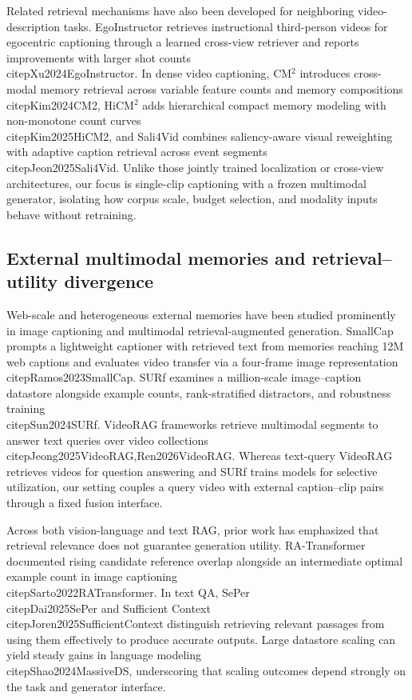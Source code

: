 \documentclass[11pt,a4paper]{article}
\begin{document}
Related retrieval mechanisms have also been developed for neighboring video-description tasks. EgoInstructor retrieves instructional third-person videos for egocentric captioning through a learned cross-view retriever and reports improvements with larger shot counts \\citep{Xu2024EgoInstructor}. In dense video captioning, CM$^2$ introduces cross-modal memory retrieval across variable feature counts and memory compositions \\citep{Kim2024CM2}, HiCM$^2$ adds hierarchical compact memory modeling with non-monotone count curves \\citep{Kim2025HiCM2}, and Sali4Vid combines saliency-aware visual reweighting with adaptive caption retrieval across event segments \\citep{Jeon2025Sali4Vid}. Unlike those jointly trained localization or cross-view architectures, our focus is single-clip captioning with a frozen multimodal generator, isolating how corpus scale, budget selection, and modality inputs behave without retraining.

\subsection{External multimodal memories and retrieval--utility divergence}
Web-scale and heterogeneous external memories have been studied prominently in image captioning and multimodal retrieval-augmented generation. SmallCap prompts a lightweight captioner with retrieved text from memories reaching 12M web captions and evaluates video transfer via a four-frame image representation \\citep{Ramos2023SmallCap}. SURf examines a million-scale image--caption datastore alongside example counts, rank-stratified distractors, and robustness training \\citep{Sun2024SURf}. VideoRAG frameworks retrieve multimodal segments to answer text queries over video collections \\citep{Jeong2025VideoRAG,Ren2026VideoRAG}. Whereas text-query VideoRAG retrieves videos for question answering and SURf trains models for selective utilization, our setting couples a query video with external caption--clip pairs through a fixed fusion interface.

Across both vision-language and text RAG, prior work has emphasized that retrieval relevance does not guarantee generation utility. RA-Transformer documented rising candidate reference overlap alongside an intermediate optimal example count in image captioning \\citep{Sarto2022RATransformer}. In text QA, SePer \\citep{Dai2025SePer} and Sufficient Context \\citep{Joren2025SufficientContext} distinguish retrieving relevant passages from using them effectively to produce accurate outputs. Large datastore scaling can yield steady gains in language modeling \\citep{Shao2024MassiveDS}, underscoring that scaling outcomes depend strongly on the task and generator interface.
\end{document}
